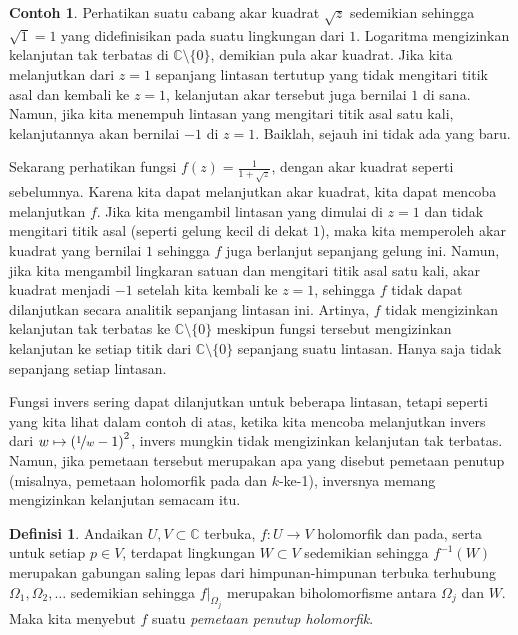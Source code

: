 \documentclass[12pt,openany]{book}
\newcommand{\C}{{\mathbb{C}}}
\newcommand{\myindex}[1]{#1\index{#1}}
\theoremstyle{plain}
\theoremstyle{remark}
\theoremstyle{definition}
\newtheorem{defn}[thm]{Definisi}
\theoremstyle{exercise}
\theoremstyle{example}
\newtheorem{example}[thm]{Contoh}
\begin{document}
\begin{example}
Perhatikan suatu cabang akar kuadrat $\sqrt{z}$ sedemikian sehingga $\sqrt{1}=1$
yang didefinisikan pada suatu lingkungan dari $1$.  Logaritma mengizinkan
kelanjutan tak terbatas di $\C \setminus \{ 0 \}$, demikian pula akar kuadrat.
Jika kita melanjutkan dari $z=1$ sepanjang lintasan tertutup yang tidak mengitari titik asal dan kembali
ke $z=1$, kelanjutan akar tersebut juga bernilai $1$ di sana.  Namun,
jika kita menempuh lintasan yang mengitari titik asal satu kali, kelanjutannya
akan bernilai $-1$ di $z=1$.  Baiklah\@, sejauh ini tidak ada yang baru.

Sekarang perhatikan fungsi $f(z) = \frac{1}{1+\sqrt{z}}$, dengan akar kuadrat
seperti sebelumnya.  Karena kita dapat melanjutkan akar kuadrat, kita dapat mencoba
melanjutkan $f$.  Jika kita mengambil lintasan yang dimulai di $z=1$ dan tidak mengitari titik asal
(seperti gelung kecil di dekat $1$), maka kita memperoleh akar kuadrat yang bernilai $1$
sehingga $f$ juga berlanjut sepanjang gelung ini.  Namun, jika kita mengambil
lingkaran satuan dan mengitari titik asal satu kali, akar kuadrat menjadi $-1$
setelah kita kembali ke $z=1$,
sehingga $f$ tidak dapat dilanjutkan secara analitik sepanjang lintasan ini.  Artinya, $f$
tidak mengizinkan kelanjutan tak terbatas ke $\C \setminus \{ 0 \}$ meskipun
fungsi tersebut mengizinkan kelanjutan ke setiap titik dari $\C \setminus \{ 0 \}$
sepanjang suatu lintasan.  Hanya saja tidak sepanjang setiap lintasan.
\end{example}

Fungsi invers sering dapat dilanjutkan untuk beberapa lintasan, tetapi seperti yang kita lihat dalam
contoh di atas, ketika
kita mencoba melanjutkan invers dari
$w \mapsto {(\nicefrac{1}{w}-1)}^2$, invers mungkin tidak mengizinkan 
kelanjutan tak terbatas.  Namun, jika pemetaan tersebut merupakan apa yang disebut pemetaan
penutup (misalnya, pemetaan holomorfik pada dan $k$-ke-1), inversnya memang
mengizinkan kelanjutan semacam itu.

\begin{defn}
Andaikan $U,V \subset \C$ terbuka, $f \colon U \to V$ holomorfik
dan pada, serta untuk setiap $p \in V$, terdapat lingkungan $W \subset
V$ sedemikian sehingga $f^{-1}(W)$ merupakan gabungan saling lepas dari himpunan-himpunan terbuka terhubung
$\Omega_1,\Omega_2,\ldots$ sedemikian sehingga $f|_{\Omega_j}$ merupakan biholomorfisme antara
$\Omega_j$ dan $W$.
Maka kita menyebut $f$ suatu \emph{\myindex{pemetaan penutup holomorfik}}.
\end{defn}
\end{document}
